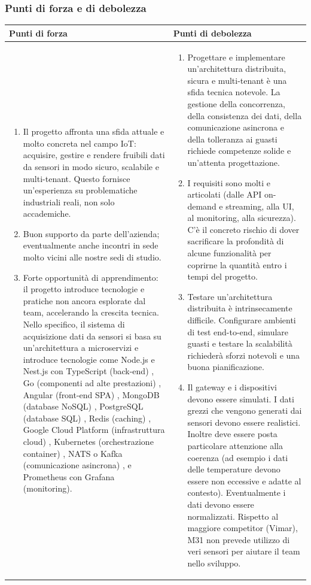 \documentclass[a4paper,11pt]{article}
\begin{document}
\subsubsection{Punti di forza e di debolezza}
{\footnotesize
\begin{tabularx}{\textwidth}{|X|X|}
\hline
\rowcolor{lightgray!40} %
\textbf{Punti di forza} & \textbf{Punti di debolezza} \\
\hline
\begin{enumerate}
\item Il progetto affronta una sfida attuale e molto concreta nel campo IoT: acquisire, gestire e rendere fruibili dati da sensori in modo sicuro, scalabile e multi-tenant. Questo fornisce un'esperienza su problematiche industriali reali, non solo accademiche.
\item Buon supporto da parte dell'azienda; eventualmente anche incontri in sede molto vicini alle nostre sedi di studio.
\item Forte opportunità di apprendimento: il progetto introduce tecnologie e pratiche non ancora esplorate dal team, accelerando la crescita tecnica. Nello specifico, il sistema di acquisizione dati da sensori si basa su un'architettura a microservizi e introduce tecnologie come Node.js e Nest.js con TypeScript (back-end) , Go (componenti ad alte prestazioni) , Angular (front-end SPA) , MongoDB (database NoSQL) , PostgreSQL (database SQL) , Redis (caching) , Google Cloud Platform (infrastruttura cloud) , Kubernetes (orchestrazione container) , NATS o Kafka (comunicazione asincrona) , e Prometheus con Grafana (monitoring).
\end{enumerate}
 & \begin{enumerate}
\item Progettare e implementare un'architettura distribuita, sicura e multi-tenant è una sfida tecnica notevole. La gestione della concorrenza, della consistenza dei dati, della comunicazione asincrona e della tolleranza ai guasti richiede competenze solide e un'attenta progettazione.
\item 	I requisiti sono molti e articolati (dalle API on-demand e streaming, alla UI, al monitoring, alla sicurezza). C'è il concreto rischio di dover sacrificare la profondità di alcune funzionalità per coprirne la quantità entro i tempi del progetto.
\item Testare un'architettura distribuita è intrinsecamente difficile. Configurare ambienti di test end-to-end, simulare guasti e testare la scalabilità richiederà sforzi notevoli e una buona pianificazione.
\item Il gateway e i dispositivi devono essere simulati. I dati grezzi che vengono generati dai sensori devono essere realistici. Inoltre deve essere posta particolare attenzione alla coerenza (ad esempio i dati delle temperature devono essere non eccessive e adatte al contesto). Eventualmente i dati devono essere normalizzati. Rispetto al maggiore competitor (Vimar), M31 non prevede utilizzo di veri sensori per aiutare il team nello sviluppo.
\end{enumerate} \\
\hline
\end{tabularx}
}
\end{document}
